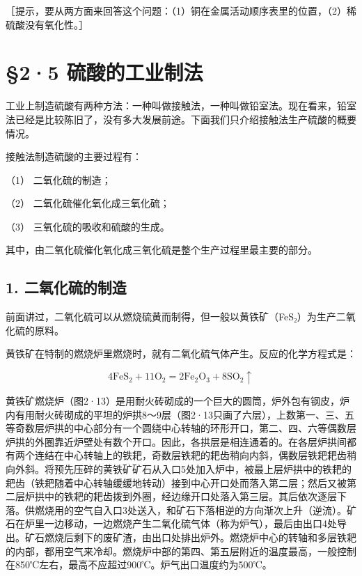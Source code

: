 ［提示，要从两方面来回答这个问题：（1）铜在金属活动顺序表里的位置，（2）稀硫酸没有氧化性。］

\section{§2·5 硫酸的工业制法}

工业上制造硫酸有两种方法：一种叫做接触法，一种叫做铅室法。现在看来，铅室法已经是比较陈旧了，没有多大发展前途。下面我们只介绍接触法生产硫酸的概要情况。

接触法制造硫酸的主要过程有：

（1） 二氧化硫的制造；

（2） 二氧化硫催化氧化成三氧化硫；

（3） 三氧化硫的吸收和硫酸的生成。

其中，由二氧化硫催化氧化成三氧化硫是整个生产过程里最主要的部分。

\subsection{1. 二氧化硫的制造}

前面讲过，二氧化硫可以从燃烧硫黄而制得，但一般以黄铁矿（FeS₂）为生产二氧化硫的原料。

黄铁矿在特制的燃烧炉里燃烧时，就有二氧化硫气体产生。反应的化学方程式是：

\[
4 \mathrm{FeS} _ {2} + 11 \mathrm{O} _ {2} = 2 \mathrm{Fe} _ {2} \mathrm{O} _ {3} + 8 \mathrm{SO} _ {2} \uparrow
\]

黄铁矿燃烧炉（图2·13）是用耐火砖砌成的一个巨大的圆筒，炉外包有钢皮，炉内有用耐火砖砌成的平坦的炉拱8～9层（图2·13只画了六层），上数第一、三、五等奇数层炉拱的中心部分有一个圆绕中心转轴的环形开口，第二、四、六等偶数层炉拱的外圈靠近炉壁处有数个开口。因此，各拱层是相连通着的。在各层炉拱间都有两个连结在中心转轴上的铁耙，奇数层铁耙的耙齿稍向内斜，偶数层铁耙耙齿稍向外斜。将预先压碎的黄铁矿矿石从入口5处加入炉中，被最上层炉拱中的铁耙的耙齿（铁耙随着中心转轴缓缓地转动）接到中心开口处而落入第二层；然后又被第二层炉拱中的铁耙的耙齿拨到外圈，经边缘开口处落入第三层。其后依次逐层下落。供燃烧用的空气自入口3处送入，和矿石下落相逆的方向渐次上升（逆流）。矿石在炉里一边移动，一边燃烧产生二氧化硫气体（称为炉气），最后由出口4处导出。矿石燃烧后剩下的废矿渣，由出口处排出炉外。燃烧炉中心的转轴和多层铁耙的内部，都用空气来冷却。燃烧炉中部的第四、第五层附近的温度最高，一般控制在850℃左右，最高不应超过900℃。炉气出口温度约为500℃。

